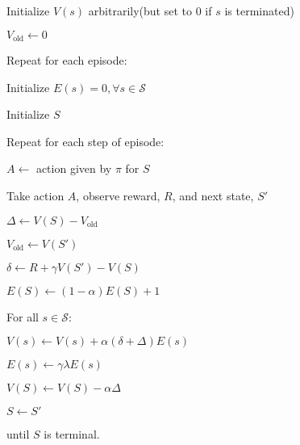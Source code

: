 \documentclass[11pt,a4paper]{article}
\def\S{{\mathcal S}}
\begin{document}
\begin{tcolorbox}
Initialize $V(s)$ arbitrarily(but set to $0$ if $s$ is terminated) \par 
$V_{\mathrm{old}} \leftarrow 0$ \par 
Repeat for each episode:\par 
\hspace{1cm} Initialize $E(s) =0, \forall s \in \S$ \par 
\hspace{1cm} Initialize $S$ \par 
\hspace{1cm} Repeat for each step of episode:\par 
\hspace{2cm} $A \leftarrow$ action given by $\pi$ for $S$ \par 
\hspace{2cm} Take action $A$, observe reward, $R$, and next state, $S'$ \par 
\hspace{2cm} $\Delta \leftarrow V(S)-V_{\mathrm{old}}$ \par 
\hspace{2cm} $V_{\mathrm{old}} \leftarrow V(S')$ \par 
\hspace{2cm} $\delta \leftarrow R + \gamma V(S') -V(S)$ \par 
\hspace{2cm} $E(S) \leftarrow (1-\alpha)E(S) + 1$ \par 
\hspace{2cm} For all $s \in \S$: \par 
\hspace{3cm} $V(s) \leftarrow V(s) + \alpha(\delta + \Delta)E(s)$ \par 
\hspace{3cm} $E(s) \leftarrow \gamma \lambda E(s)$ \par 
\hspace{2cm} $V(S) \leftarrow V(S) -\alpha \Delta$ \par 
\hspace{2cm} $S \leftarrow S'$ \par 
\hspace{1cm} until $S$ is terminal.
\end{tcolorbox}
\end{document}
